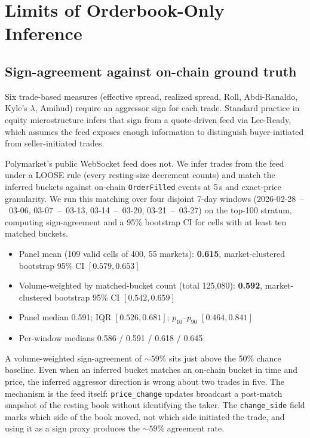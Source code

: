 \section{Limits of Orderbook-Only Inference}\label{sec:limits}

\subsection{Sign-agreement against on-chain ground truth}\label{ssec:sign-agreement}

Six trade-based measures (effective spread, realized spread, Roll,
Abdi-Ranaldo, Kyle's $\lambda$, Amihud) require an aggressor sign for
each trade. Standard practice in equity microstructure infers that
sign from a quote-driven feed via Lee-Ready, which assumes the feed
exposes enough information to distinguish buyer-initiated from
seller-initiated trades.

Polymarket's public WebSocket feed does not. We infer trades from
the feed under a LOOSE rule (every resting-size decrement counts) and
match the inferred buckets against on-chain \texttt{OrderFilled}
events at 5\,s and exact-price granularity. We run this matching over
four disjoint 7-day windows (2026-02-28~--~03-06, 03-07~--~03-13,
03-14~--~03-20, 03-21~--~03-27) on the top-100 stratum, computing
sign-agreement and a 95\% bootstrap CI for cells with at least ten
matched buckets.

\begin{itemize}
  \item Panel mean (109 valid cells of 400, 55 markets):
        \textbf{0.615}, market-clustered bootstrap 95\% CI
        $[0.579, 0.653]$
  \item Volume-weighted by matched-bucket count
        (total 125{,}080): \textbf{0.592}, market-clustered
        bootstrap 95\% CI $[0.542, 0.659]$
  \item Panel median 0.591; IQR $[0.526, 0.681]$;
        $p_{10}$--$p_{90}$ $[0.464, 0.841]$
  \item Per-window medians 0.586 / 0.591 / 0.618 / 0.645
\end{itemize}

A volume-weighted sign-agreement of $\sim 59\%$ sits just above the
50\% chance baseline. Even when an inferred bucket matches an
on-chain bucket in time and price, the inferred aggressor direction
is wrong about two trades in five. The mechanism is the feed itself:
\texttt{price\_change} updates broadcast a post-match snapshot of the
resting book without identifying the taker. The \texttt{change\_side}
field marks which side of the book moved, not which side initiated
the trade, and using it as a sign proxy produces the $\sim 59\%$
agreement rate.

